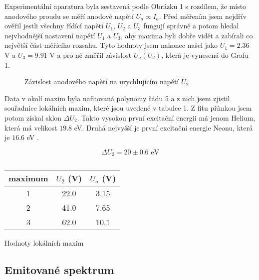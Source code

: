 \documentclass[a4paper,11pt]{article}
\begin{document}
Experimentální aparatura byla sestavená podle Obrázku 1 s rozdílem, že místo anodového proudu se měří anodové napětí $ U_a \propto I_a $. Před měřením jsem nejdřív ověřil jestli všechny řídící napětí $ U_1 $, $ U_2 $ a $ U_3 $ fungují správně a potom hledal nejvhodnější nastavení napětí $ U_1 $ a $ U_3 $, aby maxima byli dobře vidět a zabírali co největší část měřícího rozsahu. Tyto hodnoty jsem nakonec našel jako $ U_1 = 2.36 $ V a $ U_3 = 9.91 $ V a pro ně změřil závislost $ U_a(U_2) $, která je vynesená do Grafu 1. 


\begin{figure}[htpb]
    \centering
    
    \captionsetup{type=graph}
    \caption{Závislost anodového napětí na urychlujícím napětí $ U_2 $ }
\end{figure}

Data v okolí maxim byla nafitovaná polynomy řádu 5 a z nich jsem zjistil souřadnice lokálních maxim, které jsou uvedené v tabulce 1. Z fitu přímkou jsem potom získal sklon $ \Delta U_2 $. Takto vysokou první excitační energii má jenom Helium, která má velikost $ 19.8 $ eV. Druhá nejvyšší je první excitační energie Neonu, která je $ 16.6 $ eV  . 

\begin{equation}
\Delta U_2 = 20 \pm 0.6 \text{ eV}
\end{equation}


\begin{table}[htpb]
    \begin{minipage}{.4\linewidth}
        \centering
        \begin{tabular}{| c c c |}
            \hline
            maximum & $ U_2 $ (V) & $ U_a $ (V)  \\
            \hline
            1 & 22.0 & 3.15 \\
            2 & 41.0 & 7.65 \\
            3 & 62.0 & 10.1 \\
            \hline
        \end{tabular}
        \caption{Hodnoty lokálních maxim}
    \end{minipage} 
    \hfill
    \begin{minipage}{.55\linewidth}
        \centering
        \resizebox{\textwidth}{!}{  }
        \caption{}
    \end{minipage} 
\end{table}

\subsection{Emitované spektrum}
\end{document}
